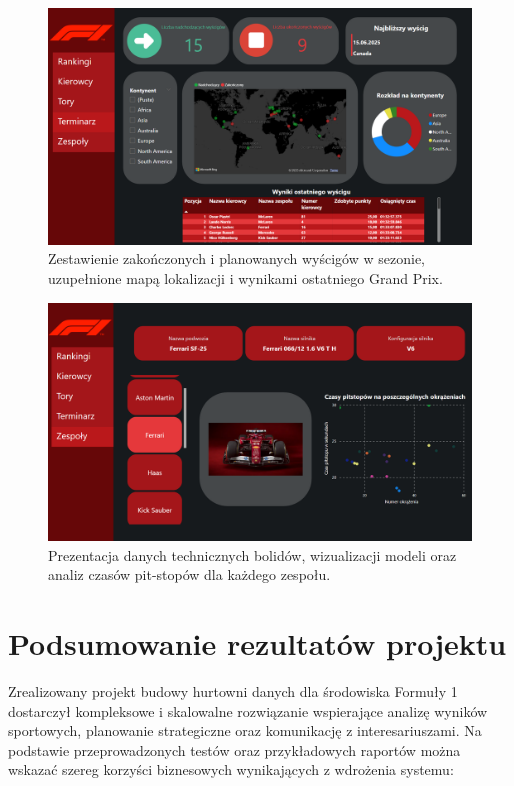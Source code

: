 \documentclass[12pt]{article}
\begin{document}
\begin{figure}[H]
    \centering
\includegraphics[width=\textwidth]{raport4.png}
    \caption{Zestawienie zakończonych i planowanych wyścigów w sezonie, uzupełnione mapą lokalizacji i wynikami ostatniego Grand Prix.}
\end{figure}


\begin{figure}[H]
    \centering
\includegraphics[width=\textwidth]{raport5.png}
    \caption{Prezentacja danych technicznych bolidów, wizualizacji modeli oraz analiz czasów pit-stopów dla każdego zespołu.}
\end{figure}

\section{Podsumowanie rezultatów projektu}

Zrealizowany projekt budowy hurtowni danych dla środowiska Formuły 1 dostarczył kompleksowe i skalowalne rozwiązanie wspierające analizę wyników sportowych, planowanie strategiczne oraz komunikację z interesariuszami. Na podstawie przeprowadzonych testów oraz przykładowych raportów można wskazać szereg korzyści biznesowych wynikających z wdrożenia systemu:
\end{document}
